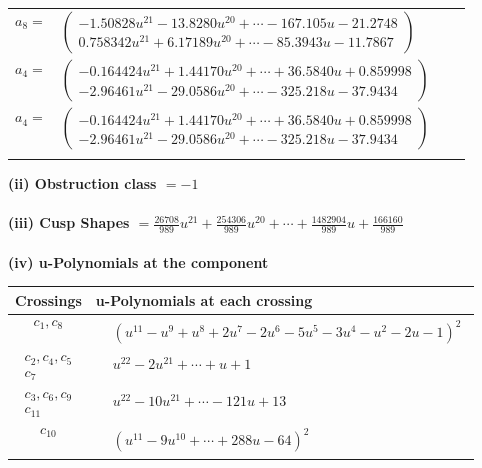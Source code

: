 \documentclass[1p]{elsarticle_modified}
\theoremstyle{definition}
\begin{document}
\begin{tabular}{m{7pt} m{180pt} m{7pt} m{180pt} }
\flushright $a_{8}=$&$\begin{pmatrix}-1.50828 u^{21}-13.8280 u^{20}+\cdots-167.105 u-21.2748\\0.758342 u^{21}+6.17189 u^{20}+\cdots-85.3943 u-11.7867\end{pmatrix}$ \\
\flushright $a_{4}=$&$\begin{pmatrix}-0.164424 u^{21}+1.44170 u^{20}+\cdots+36.5840 u+0.859998\\-2.96461 u^{21}-29.0586 u^{20}+\cdots-325.218 u-37.9434\end{pmatrix}$\\ \flushright $a_{4}=$&$\begin{pmatrix}-0.164424 u^{21}+1.44170 u^{20}+\cdots+36.5840 u+0.859998\\-2.96461 u^{21}-29.0586 u^{20}+\cdots-325.218 u-37.9434\end{pmatrix}$\\&\end{tabular}
\flushleft \textbf{(ii) Obstruction class $= -1$}\\~\\
\flushleft \textbf{(iii) Cusp Shapes $= \frac{26708}{989} u^{21}+\frac{254306}{989} u^{20}+\cdots+\frac{1482904}{989} u+\frac{166160}{989}$}\\~\\
\newpage\renewcommand{\arraystretch}{1}
\flushleft \textbf{(iv) u-Polynomials at the component}\newline \\
\begin{tabular}{m{50pt}|m{274pt}}
Crossings & \hspace{64pt}u-Polynomials at each crossing \\
\hline $$\begin{aligned}c_{1},c_{8}\end{aligned}$$&$\begin{aligned}
&(u^{11}- u^9+u^8+2 u^7-2 u^6-5 u^5-3 u^4- u^2-2 u-1)^2
\end{aligned}$\\
\hline $$\begin{aligned}c_{2},c_{4},c_{5}\\c_{7}\end{aligned}$$&$\begin{aligned}
&u^{22}-2 u^{21}+\cdots+u+1
\end{aligned}$\\
\hline $$\begin{aligned}c_{3},c_{6},c_{9}\\c_{11}\end{aligned}$$&$\begin{aligned}
&u^{22}-10 u^{21}+\cdots-121 u+13
\end{aligned}$\\
\hline $$\begin{aligned}c_{10}\end{aligned}$$&$\begin{aligned}
&(u^{11}-9 u^{10}+\cdots+288 u-64)^{2}
\end{aligned}$\\
\hline
\end{tabular}\\~\\
\end{document}
